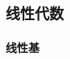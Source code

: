 \documentclass{article}
\begin{document}
\begin{multicols}{2}
			\subsection{线性代数}






				\subsubsection{线性基}









	\end{multicols}
\end{document}
